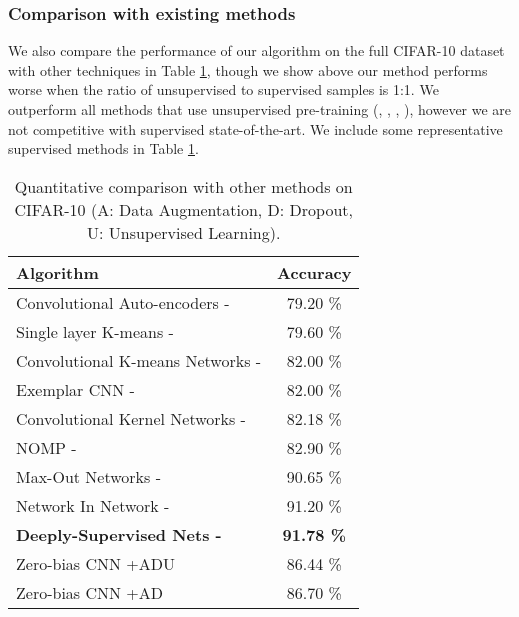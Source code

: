\documentclass{article} \usepackage{iclr2015,times}
\begin{document}
\subsubsection{Comparison with existing methods}

We also compare the performance of our algorithm on the full CIFAR-10 dataset with other techniques in Table \ref{tab:method_comp_cifar}, though we show above our method performs worse when the ratio of unsupervised to supervised samples is 1:1. We outperform all methods that use unsupervised pre-training (\citet{masci2011stacked}, \citet{coates2011analysis}, \citet{dosovitskiy2014discriminative}, \citet{lin2014stable}), however we are not competitive with supervised state-of-the-art. We include some representative supervised methods in Table \ref{tab:method_comp_cifar}. 

\begin{table}[b]
\begin{center}
    \caption{Quantitative comparison with other methods on CIFAR-10 (A: Data Augmentation, D: Dropout, U: Unsupervised Learning).}
    \label{tab:method_comp_cifar}
    \begin{tabular}{ |l | c |}
    \hline
    Algorithm & Accuracy \\ \hline    
    Convolutional Auto-encoders - \citet{masci2011stacked} & 79.20 \% \\ Single layer K-means - \citet{coates2011analysis} & 79.60 \% \\ Convolutional K-means Networks - \citet{coates2011selecting} & 82.00 \% \\ Exemplar CNN - \citet{dosovitskiy2014discriminative} & 82.00 \% \\ Convolutional Kernel Networks - \citet{Mairal2014convolutional} & 82.18 \% \\ NOMP - \citet{lin2014stable} & 82.90 \% \\ Max-Out Networks - \citet{goodfellow2013maxout} & 90.65 \% \\
    Network In Network - \citet{lin2013network} & 91.20 \% \\ 
    \textbf{Deeply-Supervised Nets - \citet{lee2014deeply}} & \textbf{91.78 \%} \\
    \hline
    \hline
    Zero-bias CNN +ADU &  86.44 \% \\ \hline
    Zero-bias CNN +AD &  86.70 \% \\ 
    \hline
    \end{tabular}
\end{center}
\end{table}
\end{document}

